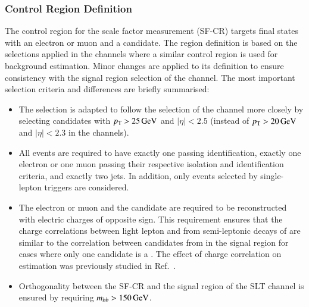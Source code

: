 \subsubsection{Control Region Definition}

The control region for the scale factor measurement (SF-CR) targets
final states with an electron or muon and a \tauhadvis candidate. The
region definition is based on the selections applied in the \lephad
channels where a similar control region is used for \faketauhadvis
background estimation. Minor changes are applied to its definition to
ensure consistency with the signal region selection of the \hadhad
channel. The most important selection criteria and differences are
briefly summarised:
\begin{itemize}

\item The \tauhadvis selection is adapted to follow the selection of
  the \hadhad channel more closely by selecting candidates with
  $p_{\text{T}} > \SI{25}{\ensuremath{\text{GeV}}}$ and $|\eta| < \num{2.5}$ (instead of
  $\pT > \SI{20}{\GeV}$ and $|\eta| < \num{2.3}$ in the \lephad
  channels).

\item All events are required to have exactly one \tauhadvis passing
  identification, exactly one electron or one muon passing their
  respective isolation and identification criteria, and exactly two
  \btagged jets. In addition, only events selected by single-lepton
  triggers are considered.

\item The electron or muon and the \tauhadvis candidate are required
  to be reconstructed with electric charges of opposite sign. This
  requirement ensures that the charge correlations between light
  lepton and \faketauhadvis from semi-leptonic decays of \ttbar are
  similar to the correlation between \tauhadvis candidates from
  \ttbarFakes in the \hadhad signal region for cases where only one
  candidate is a \faketauhadvis. The effect of charge correlation on
  \ttbarFakes estimation was previously studied in Ref.~\cite{bokan}.

\item Orthogonality between the SF-CR and the signal region of the
  \lephad SLT channel is ensured by requiring $m_{bb} > \SI{150}{\ensuremath{\text{GeV}}}$.

\end{itemize}


